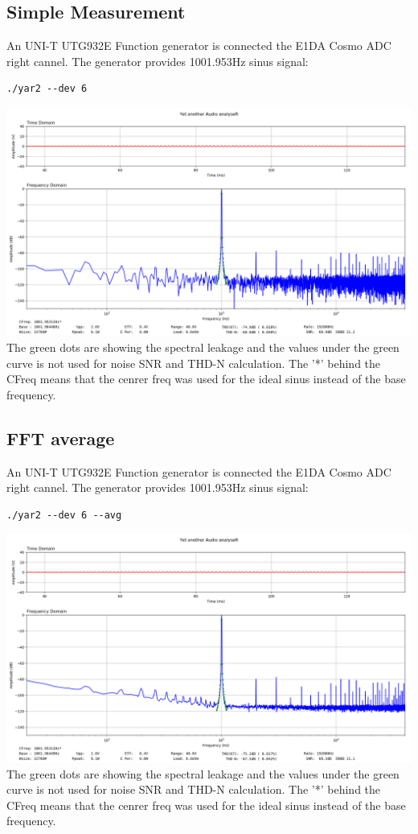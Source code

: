 \documentclass[10pt,a4paper]{article}
\begin{document}
\subsection{Simple Measurement}
An UNI-T UTG932E Function generator is connected the E1DA Cosmo ADC right cannel. The generator provides 1001.953Hz sinus signal:
\begin{verbatim}
./yar2 --dev 6
\end{verbatim}
\includegraphics[width=\textwidth]{utg932e_1002Hz.png}
The green dots are showing the spectral leakage and the values under the green curve is not used for noise SNR and THD-N calculation. The '*' behind the CFreq means that the cenrer freq was used for the ideal sinus instead of the base frequency. 

\subsection{FFT average}
An UNI-T UTG932E Function generator is connected the E1DA Cosmo ADC right cannel. The generator provides 1001.953Hz sinus signal:

\begin{verbatim}
./yar2 --dev 6 --avg
\end{verbatim}
\includegraphics[width=\textwidth]{utg932e_avg_1002Hz.png}
The green dots are showing the spectral leakage and the values under the green curve is not used for noise SNR and THD-N calculation. The '*' behind the CFreq means that the cenrer freq was used for the ideal sinus instead of the base frequency. 
\end{document}
